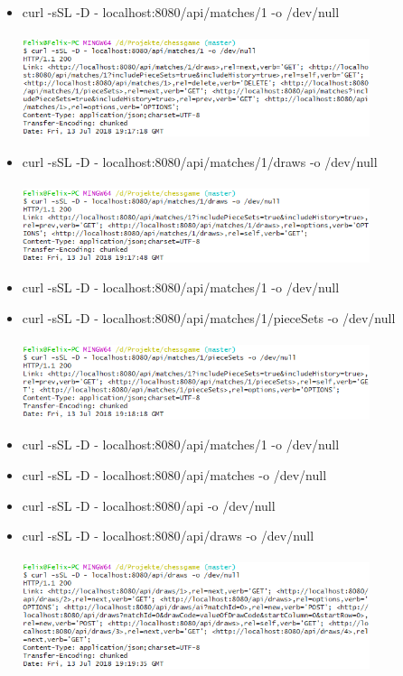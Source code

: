 \begin{enumerate}
\begin{itemize}
			\newpage
			\item curl -sSL -D - localhost:8080/api/matches/1 -o /dev/null\\
				\\
				\includegraphics[width=0.8\textwidth]{images/question3.7.png}
			\item curl -sSL -D - localhost:8080/api/matches/1/draws -o /dev/null\\
				\\
				\includegraphics[width=0.8\textwidth]{images/question3.8.png}
			\item curl -sSL -D - localhost:8080/api/matches/1 -o /dev/null
			\item curl -sSL -D - localhost:8080/api/matches/1/pieceSets -o /dev/null\\
				\\
				\includegraphics[width=0.8\textwidth]{images/question3.10.png}
			\item curl -sSL -D - localhost:8080/api/matches/1 -o /dev/null
			\item curl -sSL -D - localhost:8080/api/matches -o /dev/null
			\item curl -sSL -D - localhost:8080/api -o /dev/null
			\item curl -sSL -D - localhost:8080/api/draws -o /dev/null\\
				\\
				\includegraphics[width=0.8\textwidth]{images/question3.14.png}

\end{itemize}
\end{enumerate}
